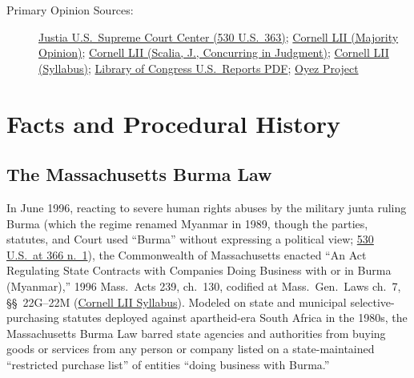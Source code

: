 \documentclass[12pt]{article}
\begin{document}
\begin{description}
    \item[Primary Opinion Sources:] \href{https://supreme.justia.com/cases/federal/us/530/363/}{Justia U.S.\ Supreme Court Center (530 U.S.\ 363)}; \href{https://www.law.cornell.edu/supct/html/99-474.ZO.html}{Cornell LII (Majority Opinion)}; \href{https://www.law.cornell.edu/supct/html/99-474.ZC.html}{Cornell LII (Scalia, J., Concurring in Judgment)}; \href{https://www.law.cornell.edu/supct/html/99-474.ZS.html}{Cornell LII (Syllabus)}; \href{https://tile.loc.gov/storage-services/service/ll/usrep/usrep530/usrep530363/usrep530363.pdf}{Library of Congress U.S.\ Reports PDF}; \href{https://www.oyez.org/cases/1999/99-474}{Oyez Project}
\end{description}

\section{Facts and Procedural History}

\subsection{The Massachusetts Burma Law}
In June 1996, reacting to severe human rights abuses by the military junta ruling Burma (which the regime renamed Myanmar in 1989, though the parties, statutes, and Court used ``Burma'' without expressing a political view; \href{https://supreme.justia.com/cases/federal/us/530/363/}{530 U.S.\ at 366 n.\ 1}), the Commonwealth of Massachusetts enacted ``An Act Regulating State Contracts with Companies Doing Business with or in Burma (Myanmar),'' 1996 Mass.\ Acts 239, ch.\ 130, codified at Mass.\ Gen.\ Laws ch.\ 7, \S\S~22G--22M (\href{https://www.law.cornell.edu/supct/html/99-474.ZS.html}{Cornell LII Syllabus}). Modeled on state and municipal selective-purchasing statutes deployed against apartheid-era South Africa in the 1980s, the Massachusetts Burma Law barred state agencies and authorities from buying goods or services from any person or company listed on a state-maintained ``restricted purchase list'' of entities ``doing business with Burma.''
\end{document}
